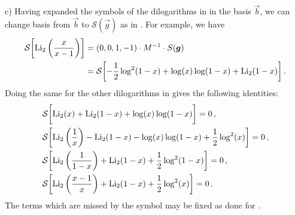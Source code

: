 \smallskip
\noindent
c) Having expanded the symbols of the dilogarithms in  in the basis $\vec{b}$, 
we can change basis from $\vec{b}$ to $\mathcal{S}(\vec{g})$ as in . For example, we have
\begin{align} \begin{aligned}
\mathcal{S}\biggl[{\rm Li}_{2}\left(\frac{x}{x-1}\right)\biggr] & = (0, 0, 1, -1) \cdot M^{-1} \cdot S(\vec{g}) \\
& = \mathcal{S}\biggl[-\frac{1}{2} \log^2 (1-x) + \log(x) \log (1-x) + {\rm Li}_{2}(1-x) \biggl] \,.
\end{aligned} \end{align}
Doing the same for the other dilogarithms in  gives the following identities:
\begin{align}
& \mathcal{S}\biggl[  {\rm Li}_{2}(x) + {\rm Li}_{2}(1 - x) + \log(x) \log(1 - x)  \biggr] = 0 \,, \\
& \mathcal{S}\biggl[ {\rm Li}_{2}\left(\frac{1}{x}\right) - {\rm Li}_{2}(1 - x)  - \log(x) \log(1 - x) + \frac{1}{2} \log^2(x) \biggr] = 0 \,, \\
& \mathcal{S}\biggl[ {\rm Li}_{2}\left(\frac{1}{1-x}\right) + {\rm Li}_2(1 - x)  + \frac{1}{2} \log^2(1 - x) \biggr] = 0 \,, \\
& \mathcal{S}\biggl[  {\rm Li}_{2}\left(\frac{x-1}{x} \right) + {\rm Li}_2(1 - x) + \frac{1}{2} \log^2(x) \biggr] = 0 \,.
\end{align}
The terms which are missed by the symbol may be fixed as done for .


